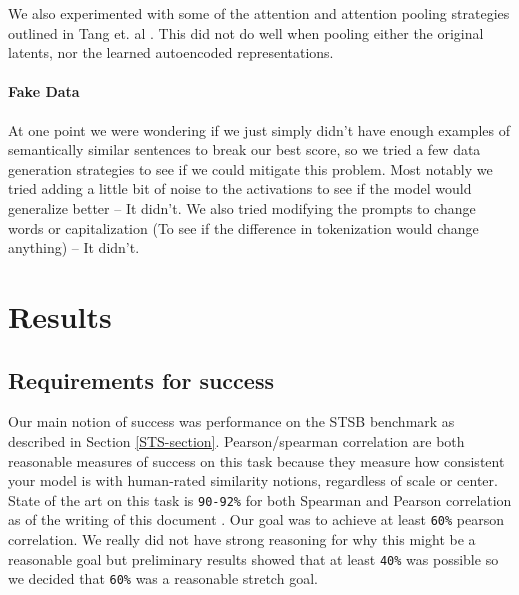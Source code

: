 \documentclass{article}
\begin{document}
We also experimented with some of the attention and attention pooling strategies outlined in Tang et. al \cite{tang2024poolingattentioneffectivedesigns}. This did not do well when pooling either the original latents, nor the learned autoencoded representations.

\paragraph*{Fake Data}
At one point we were wondering if we just simply didn't have enough examples of semantically similar sentences to break our best score, so we tried a few data generation strategies to see if we could mitigate this problem. Most notably we tried adding a little bit of noise to the activations to see if the model would generalize better -- It didn't. We also tried modifying the prompts to change words or capitalization (To see if the difference in tokenization would change anything) -- It didn't.

\section{Results}
\subsection{Requirements for success}
Our main notion of success was performance on the STSB \cite{STS} benchmark as described in Section \ref{STS-section}. Pearson/spearman correlation are both reasonable measures of success on this task because they measure how consistent your model is with human-rated similarity notions, regardless of scale or center. State of the art on this task is \verb|90-92%| for both Spearman and Pearson correlation as of the writing of this document \cite{muennighoff2022mteb}. Our goal was to achieve at least \verb|60%| pearson correlation. We really did not have strong reasoning for why this might be a reasonable goal but preliminary results showed that at least \verb|40%| was possible so we decided that \verb|60%| was a reasonable stretch goal.
\end{document}
